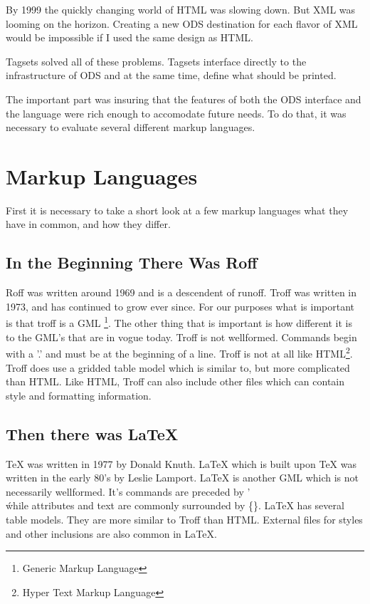 By 1999 the quickly changing world of HTML was slowing down.  But XML was
looming on the horizon.  Creating a new ODS destination for each flavor of
XML would be impossible if I used the same design as HTML.  

Tagsets solved all of these problems.  Tagsets interface directly to the 
infrastructure of ODS and at the same time, define what should be printed.

The important part was insuring that the features of both the ODS 
interface and the language were rich enough to accomodate future needs.  To
do that, it was necessary to evaluate several different markup languages.

\section{Markup Languages}

First it is necessary to take a short look at a few markup languages what they
have in common, and how they differ.

\subsection{In the Beginning There Was Roff}

Roff was written around 1969 and is a descendent of runoff.  Troff was written in 1973,
and has continued to grow ever since. For our purposes what is important is that troff
is a GML \footnote{Generic Markup Language}.  The other thing that is important is how
different it is to the GML's that are in vogue today.  Troff is not wellformed.  
Commands begin with a '.' and must be at the beginning of a line.  Troff
is not at all like HTML\footnote{Hyper Text Markup Language}.  
Troff does use a gridded table model which is similar to, but more
complicated than HTML.  Like HTML, Troff can also include other
files which can contain style and formatting information.

\subsection{Then there was LaTeX}

TeX was written in 1977 by Donald Knuth.  LaTeX which is built upon TeX was written in 
the early 80's by Leslie Lamport.  LaTeX is another GML which is not necessarily wellformed.
It's commands are preceded by '\\\' while attributes and text are commonly surrounded by \{\}.
LaTeX has several table models.  They are more similar to Troff than HTML.  External files
for styles and other inclusions are also common in LaTeX.

